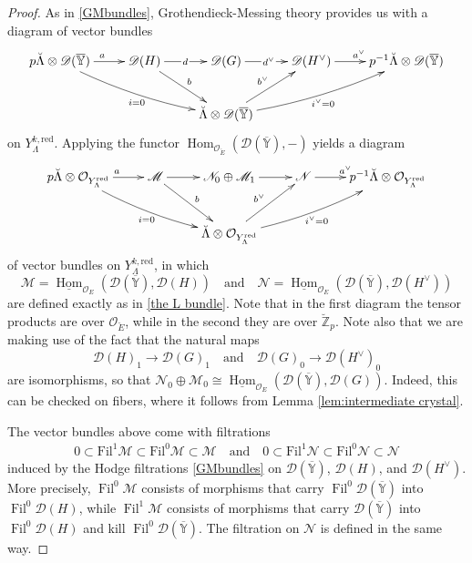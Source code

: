 \documentclass[11pt]{alggeom}
\newcommand{\iso}{\cong}
\newcommand{\red}{\mathrm{red}}
\newcommand{\Z}{\mathbb Z}
\newcommand{\co}{\mathcal O}
\DeclareMathOperator{\Hom}{Hom}
\DeclareMathOperator{\Fil}{Fil}
\begin{document}
\begin{proof}
As in  \eqref{GMbundles}, Grothendieck-Messing theory provides us with a diagram of vector bundles
\[
\xymatrix{
{p  \breve{\Lambda}  \otimes \mathscr{D}(\overline{\mathbb{Y}})   }\ar[r]^a    \ar@/_/[drr]_{i =0 }  &  {\mathscr{D}(H)} \ar[dr]^b  \ar[r]|{\, d\, }   &  
{\mathscr{D}(G) } \ar[r]|{\, d^\vee \, }  & {\mathscr{ D }(H^\vee)  }  \ar[r]^{a^\vee}  & {p^{-1}   \breve{\Lambda}    \otimes \mathscr{D}(\overline{\mathbb{Y}})     } \\
& &  {   \breve{\Lambda}   \otimes \mathscr{D}(\overline{\mathbb{Y}})    } \ar[ur]^{b^\vee} \ar@/_/[urr]_{i^\vee=0}
}
\]
on $Y^{k,\red}_\Lambda$.
Applying the functor $\Hom_{\co_{\breve{E}}}( \mathscr{D}(\overline{\mathbb{Y}})  , - )$ yields a diagram
\[
\xymatrix{
{p  \breve{\Lambda}  \otimes \co_{Y^\red_\Lambda}    }\ar[r]^a    \ar@/_/[drr]_{i =0 }  &  {\mathscr{M}} \ar[dr]^b  \ar[r]  &  
{\mathscr{N}_0 \oplus \mathscr{M}_1 } \ar[r]   & {\mathscr{ N } }  \ar[r]^{a^\vee}  & {p^{-1}   \breve{\Lambda} \otimes   \co_{Y^\red_\Lambda}    } \\
& &  {   \breve{\Lambda}   \otimes \co_{Y^\red_\Lambda}    } \ar[ur]^{b^\vee} \ar@/_/[urr]_{i^\vee=0}
}
\]
 of vector bundles on $Y^{k,\red}_\Lambda$, in which 
\[
\mathscr{M} =  \underline{\Hom}_{\co_E} ( \mathscr{D}(  \overline{\mathbb{Y}} ) ,  \mathscr{D}(H) )
\quad\mbox{and}\quad
\mathscr{N} =   \underline{\Hom}_{\co_E} ( \mathscr{D}(  \overline{\mathbb{Y}} ) ,  \mathscr{D}(H^\vee) ) 
\]
are defined exactly as in \eqref{the L bundle}.
Note that in the first diagram the tensor products are over $\co_{\breve{E}}$, while in the second they are over $\breve{\Z}_p$.  
 Note also that we are making use of the fact  that the natural maps
\[
\mathcal{D}(H)_1 \to  \mathcal{D}(G)_1 \quad\mbox{and}\quad \mathcal{D}(G)_0 \to \mathcal{D}(H^\vee)_0
\]
are isomorphisms, so that 
$
\mathscr{N}_0 \oplus \mathscr{M}_0 \iso 
\underline{\Hom}_{\co_E} ( \mathscr{D}(  \overline{\mathbb{Y}} ) ,  \mathscr{D}(G) ) .
$
  Indeed,  this can be checked  on fibers,  where it follows from Lemma \ref{lem:intermediate crystal}.



The vector bundles above come with filtrations 
\begin{align*}
0\subset 
 \mathrm{Fil}^1 \mathscr{M} \subset 
 \mathrm{Fil}^0 \mathscr{M} \subset 
\mathscr{M} \quad\mbox{and}\quad 
0\subset 
 \mathrm{Fil}^1 \mathscr{N} \subset 
 \mathrm{Fil}^0 \mathscr{N} \subset 
\mathscr{N}  
\end{align*}
induced by the Hodge filtrations \eqref{GMbundles} on 
$\mathscr{D}(  \overline{\mathbb{Y}} )$,   $\mathscr{D}(H)$, and  $\mathscr{D}(H^\vee)$.
More precisely,  $\Fil^0 \mathscr{M}$ consists of morphisms that carry $\Fil^0 \mathscr{D}(  \overline{\mathbb{Y}} )$ into $\Fil^0 \mathscr{D}(H)$, while $\Fil^1\mathscr{M}$ consists of morphisms that  carry 
$ \mathscr{D}(  \overline{\mathbb{Y}} )$ into $\Fil^0 \mathscr{D}(H)$ and kill $\Fil^0 \mathscr{D}(  \overline{\mathbb{Y}} )$.
The filtration on $\mathscr{N}$ is defined in the same way.




\end{proof}
\end{document}
